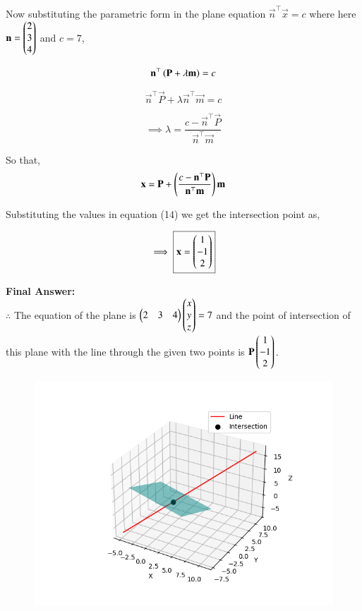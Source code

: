 \documentclass[journal,12pt,onecolumn]{IEEEtran}
\theoremstyle{remark}
\begin{document}
Now substituting the parametric form in the plane equation $\vec{n}^{\top}\vec{x} = c$ where here $\mathbf{n} = \begin{pmatrix}2\\3\\4\end{pmatrix}$ and $c = 7$,

\begin{equation}
    \mathbf{n}^{\top}\left(\mathbf{P} + \lambda \mathbf{m}\right) = c
\end{equation}

\begin{equation}
    \vec{n}^{\top}\vec{P} + \lambda \vec{n}^{\top}\vec{m} = c
\end{equation}

\begin{equation}
    \implies \lambda = \frac{c - \vec{n}^{\top}\vec{P}}{\vec{n}^{\top}\vec{m}}
\end{equation}

So that, 
\begin{equation}
  \mathbf{x} = \mathbf{P} + \left(\frac{c - \mathbf{n}^{\top}\mathbf{P}}{\mathbf{n}^{\top}\mathbf{m}}\right)\mathbf{m}
\end{equation}

Substituting the values in equation (14) we get the intersection point as,

\begin{equation}
    \implies \fbox{$\mathbf{x} = \begin{pmatrix}1\\-1\\2\end{pmatrix}$}
\end{equation}

\textbf{Final Answer: }\\
$\therefore$ The equation of the plane is $\begin{pmatrix}2&3&4\end{pmatrix}\begin{pmatrix}x\\y\\z\end{pmatrix}=7$ and the point of intersection of this plane with the line through the given two points is $\mathbf{P}\begin{pmatrix}1\\-1\\2\end{pmatrix}$.

\begin{figure}[H]
    \centering
    \includegraphics[width=0.65\columnwidth]{figs/1.png}
    \caption{}
\end{figure}
\end{document}

